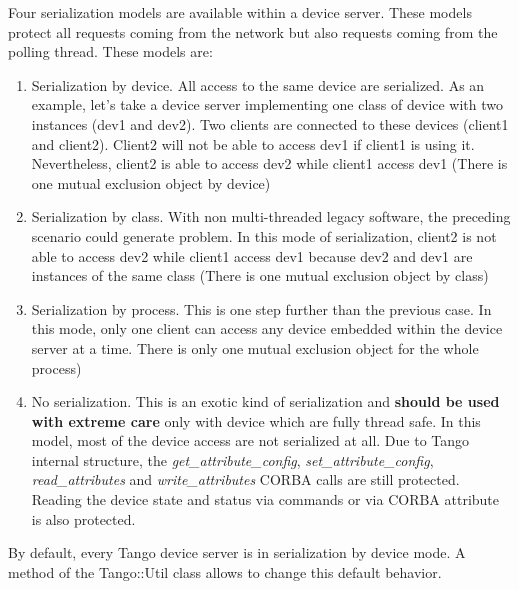 Four serialization models are available within
a device server. These models protect all requests coming from the
network but also requests coming from the polling thread. These models
are:
\begin{enumerate}
\item Serialization by device. All access to the same device are serialized.
As an example, let's take a device server implementing one class of
device with two instances (dev1 and dev2). Two clients are connected
to these devices (client1 and client2). Client2 will not be able to
access dev1 if client1 is using it. Nevertheless, client2 is able
to access dev2 while client1 access dev1 (There is one mutual exclusion
object by device)
\item Serialization by class. With non multi-threaded legacy software, the
preceding scenario could generate problem. In this mode of serialization,
client2 is not able to access dev2 while client1 access dev1 because
dev2 and dev1 are instances of the same class (There is one mutual
exclusion object by class)
\item Serialization by process. This is one step further than the previous
case. In this mode, only one client can access any device embedded
within the device server at a time. There is only one mutual exclusion
object for the whole process)
\item No serialization. This is an exotic kind of serialization and \textbf{should
be used with extreme care} only with device which are fully thread
safe. In this model, most of the device access are not serialized
at all. Due to Tango internal structure, the \emph{get\_attribute\_config},
\emph{set\_attribute\_config}, \emph{read\_attributes} and \emph{write\_attributes}
CORBA calls are still protected. Reading the device state and status
via commands or via CORBA attribute is also protected.
\end{enumerate}
By default, every Tango device server is in serialization by device
mode. A method of the Tango::Util class allows to change this default
behavior.\newpage{}

